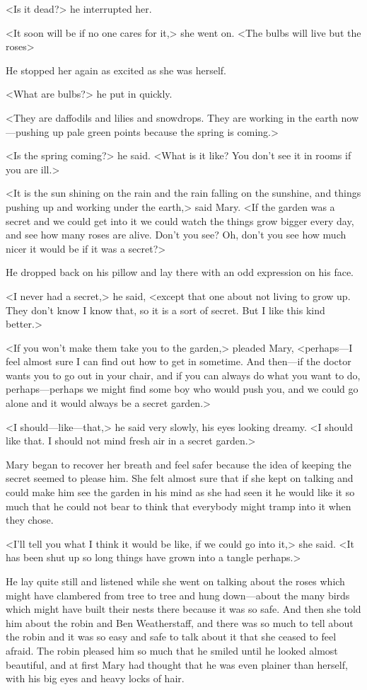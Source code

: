 <Is it dead?> he interrupted her.

<It soon will be if no one cares for it,> she went on. <The bulbs will live but the roses\longdash>

He stopped her again as excited as she was herself.

<What are bulbs?> he put in quickly.

<They are daffodils and lilies and snowdrops. They are working in the earth now—pushing up pale green points because the spring is coming.>

<Is the spring coming?> he said. <What is it like? You don't see it in rooms if you are ill.>

<It is the sun shining on the rain and the rain falling on the sunshine, and things pushing up and working under the earth,> said Mary. <If the garden was a secret and we could get into it we could watch the things grow bigger every day, and see how many roses are alive. Don't you see? Oh, don't you see how much nicer it would be if it was a secret?>

He dropped back on his pillow and lay there with an odd expression on his face.

<I never had a secret,> he said, <except that one about not living to grow up. They don't know I know that, so it is a sort of secret. But I like this kind better.>

<If you won't make them take you to the garden,> pleaded Mary, <perhaps—I feel almost sure I can find out how to get in sometime. And then—if the doctor wants you to go out in your chair, and if you can always do what you want to do, perhaps—perhaps we might find some boy who would push you, and we could go alone and it would always be a secret garden.>

<I should—like—that,> he said very slowly, his eyes looking dreamy. <I should like that. I should not mind fresh air in a secret garden.>

Mary began to recover her breath and feel safer because the idea of keeping the secret seemed to please him. She felt almost sure that if she kept on talking and could make him see the garden in his mind as she had seen it he would like it so much that he could not bear to think that everybody might tramp into it when they chose.

<I'll tell you what I think it would be like, if we could go into it,> she said. <It has been shut up so long things have grown into a tangle perhaps.>

He lay quite still and listened while she went on talking about the roses which might have clambered from tree to tree and hung down—about the many birds which might have built their nests there because it was so safe. And then she told him about the robin and Ben Weatherstaff, and there was so much to tell about the robin and it was so easy and safe to talk about it that she ceased to feel afraid. The robin pleased him so much that he smiled until he looked almost beautiful, and at first Mary had thought that he was even plainer than herself, with his big eyes and heavy locks of hair.

